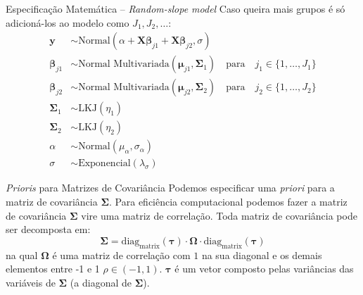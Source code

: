 \begin{frame}{Especificação Matemática -- \textit{Random-slope model}}
	Caso queira mais grupos é só adicioná-los ao modelo como $J_1, J_2, \dots$:
	$$
		\begin{aligned}
			\boldsymbol{y}          & \sim \text{Normal}(\alpha + \mathbf{X} \boldsymbol{\beta}_{j1} + \mathbf{X} \boldsymbol{\beta}_{j2}, \sigma) \\
			\boldsymbol{\beta}_{j1} & \sim \text{Normal Multivariada}(\boldsymbol{\mu}_{j1}, \boldsymbol{\Sigma}_1)
			\quad \text{para}\quad j_1 \in \{ 1, \dots, J_1 \}                                                                                     \\
			\boldsymbol{\beta}_{j2} & \sim \text{Normal Multivariada}(\boldsymbol{\mu}_{j2}, \boldsymbol{\Sigma}_2)
			\quad \text{para}\quad j_2 \in \{ 1, \dots, J_2 \}                                                                                     \\
			\boldsymbol{\Sigma}_1   & \sim \text{LKJ}(\eta_1)                                                                                      \\
			\boldsymbol{\Sigma}_2   & \sim \text{LKJ}(\eta_2)                                                                                      \\
			\alpha                  & \sim \text{Normal}(\mu_\alpha, \sigma_\alpha)                                                                \\
			\sigma                  & \sim \text{Exponencial}(\lambda_\sigma)
		\end{aligned}
	$$
\end{frame}

\begin{frame}{\textit{Prioris} para Matrizes de Covariância}
	Podemos especificar uma \textit{priori} para a matriz de covariância
	$\boldsymbol{\Sigma}$.
	\vfill
	Para eficiência computacional podemos fazer a matriz de covariância
	$\boldsymbol{\Sigma}$ vire uma matriz de correlação. Toda matriz de
	covariância pode ser decomposta em:
	$$
		\boldsymbol{\Sigma}=\text{diag}_\text{matrix}(\boldsymbol{\tau}) \cdot \boldsymbol{\Omega} \cdot \text{diag}_\text{matrix}(\boldsymbol{\tau})
	$$
	na qual $\boldsymbol{\Omega}$ é uma matriz de correlação com
	$1$ na sua diagonal e os demais elementos entre -1 e 1 $\rho \in (-1, 1)$.
	$\boldsymbol{\tau}$ é um vetor composto pelas variâncias das variáveis de
	$\boldsymbol{\Sigma}$ (a diagonal de $\boldsymbol{\Sigma}$).
\end{frame}

